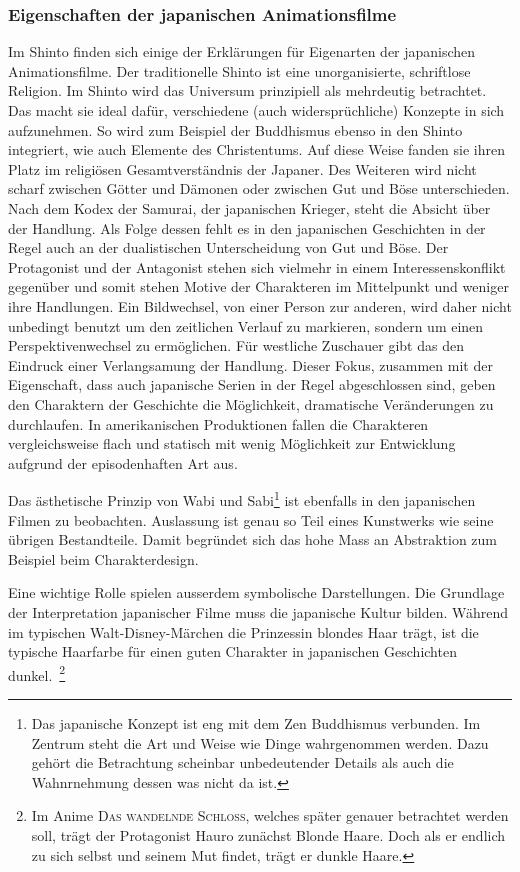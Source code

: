\subsubsection{Eigenschaften der japanischen Animationsfilme}
Im Shinto finden sich einige der Erklärungen für Eigenarten der japanischen Animationsfilme. Der traditionelle Shinto ist eine unorganisierte, schriftlose Religion. Im Shinto wird das Universum prinzipiell als mehrdeutig betrachtet. Das macht sie ideal dafür, verschiedene (auch widersprüchliche) Konzepte in sich aufzunehmen. So wird zum Beispiel der Buddhismus ebenso in den Shinto integriert, wie auch Elemente des Christentums. Auf diese Weise fanden sie ihren Platz im religiösen Gesamtverständnis der Japaner. Des Weiteren wird nicht scharf zwischen Götter und Dämonen oder zwischen Gut und Böse unterschieden. Nach dem Kodex der Samurai, der japanischen Krieger, steht die Absicht über der Handlung. Als Folge dessen fehlt es in den japanischen Geschichten in der Regel auch an der dualistischen Unterscheidung von Gut und Böse. Der Protagonist und der Antagonist stehen sich vielmehr in einem Interessenskonflikt gegenüber und somit stehen Motive der Charakteren im Mittelpunkt und weniger ihre Handlungen. Ein Bildwechsel, von einer Person zur anderen, wird daher nicht unbedingt benutzt um den zeitlichen Verlauf zu markieren, sondern um einen Perspektivenwechsel zu ermöglichen. Für westliche Zuschauer gibt das den Eindruck einer Verlangsamung der Handlung. Dieser Fokus, zusammen mit der Eigenschaft, dass auch japanische Serien in der Regel abgeschlossen sind, geben den Charaktern der Geschichte die Möglichkeit, dramatische Veränderungen zu durchlaufen. In amerikanischen Produktionen fallen die Charakteren vergleichsweise flach und statisch mit wenig Möglichkeit zur Entwicklung aufgrund der episodenhaften Art aus. 

Das ästhetische Prinzip von Wabi und Sabi\footnote{Das japanische Konzept ist eng mit dem Zen Buddhismus verbunden. Im Zentrum steht die Art und Weise wie Dinge wahrgenommen werden. Dazu gehört die Betrachtung scheinbar unbedeutender Details als auch die Wahnrnehmung dessen was nicht da ist.} ist ebenfalls in den japanischen Filmen zu beobachten. Auslassung ist genau so Teil eines Kunstwerks wie seine übrigen Bestandteile. Damit begründet sich das hohe Mass an Abstraktion zum Beispiel beim Charakterdesign.
 
Eine wichtige Rolle spielen ausserdem symbolische Darstellungen. Die Grundlage der Interpretation japanischer Filme muss die japanische Kultur bilden. Während im typischen Walt-Disney-Märchen die Prinzessin blondes Haar trägt, ist die typische Haarfarbe für einen guten Charakter in japanischen Geschichten dunkel.~\footnote{Im Anime \textsc{Das wandelnde Schloss}, welches später genauer betrachtet werden soll, trägt der Protagonist Hauro zunächst Blonde Haare. Doch als er endlich zu sich selbst und seinem Mut findet, trägt er dunkle Haare.} 

